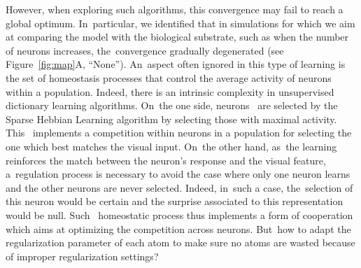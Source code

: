 \documentclass[vision,article,accept,oneauthor,pdftex]{Definitions/mdpi}
\begin{document}
However, when exploring such algorithms, this convergence may fail to reach a global optimum. In~particular, we identified that in simulations for which we aim at comparing the model with the biological substrate, such as when the number of neurons increases, the~convergence gradually degenerated (see Figure~\ref{fig:map}A, ``None''). An~aspect often ignored in this type of learning is the set of homeostasis processes that control the average activity of neurons within a population. Indeed, there is an intrinsic complexity in unsupervised dictionary learning algorithms. On~the one side, neurons~ are selected by the Sparse Hebbian Learning algorithm by selecting those with maximal activity. This~ implements a competition within neurons in a population for selecting the one which best matches the visual input. On~the other hand, as~the learning reinforces the match between the neuron's response and the visual feature, a~regulation process is necessary to avoid the case where only one neuron learns and the other neurons are never selected. Indeed, in~such a case, the~selection of this neuron would be certain and the surprise associated to this representation would be null. Such~ homeostatic process thus implements a form of cooperation which aims at optimizing the competition across neurons. But~how to adapt the regularization parameter of each atom to make sure no atoms are wasted because of improper regularization settings?
\end{document}
